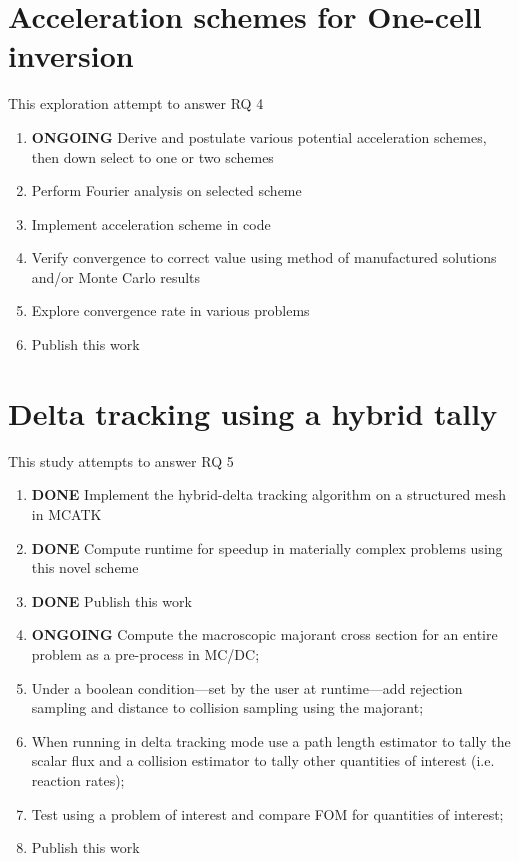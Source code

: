 \section{Acceleration schemes for One-cell inversion}
This exploration attempt to answer RQ 4
\begin{enumerate}
    \item \textbf{ONGOING} Derive and postulate various potential acceleration schemes, then down select to one or two schemes
    \item Perform Fourier analysis on selected scheme
    \item Implement acceleration scheme in code
    \item Verify convergence to correct value using method of manufactured solutions and/or Monte Carlo results
    \item Explore convergence rate in various problems
    \item Publish this work
\end{enumerate}

\section{Delta tracking using a hybrid tally}
This study attempts to answer RQ 5
\begin{enumerate}
    \item \textbf{DONE} Implement the hybrid-delta tracking algorithm on a structured mesh in MCATK
    \item \textbf{DONE} Compute runtime for speedup in materially complex problems using this novel scheme
    \item \textbf{DONE} Publish this work
    \item \textbf{ONGOING} Compute the macroscopic majorant cross section for an entire problem as a pre-process in MC/DC;
    \item Under a boolean condition---set by the user at runtime---add rejection sampling and distance to collision sampling using the majorant;
    \item When running in delta tracking mode use a path length estimator to tally the scalar flux and a collision estimator to tally other quantities of interest (i.e. reaction rates);
    \item Test using a problem of interest and compare FOM for quantities of interest;
    \item Publish this work
\end{enumerate}

